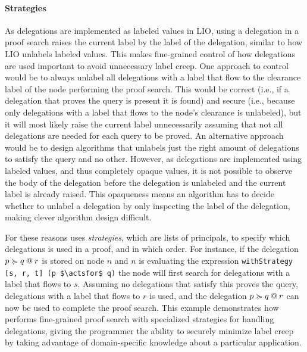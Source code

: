 \paragraph{Strategies}
As delegations are implemented as labeled values in LIO, using a delegation in a proof search raises the current label by the label of the delegation, similar to how LIO unlabels labeled values. This makes fine-grained control of how delegations are used important to avoid unnecessary label creep.
One approach to control would be to always unlabel all delegations with a label that flow to the clearance label of the node performing the proof search. This would be correct (i.e., if a delegation that proves the query is present it is found) and secure (i.e., because only delegations with a label that flows to the node's clearance is unlabeled), but it will most likely raise the current label unnecessarily assuming that not all delegations are needed for each query to be proved.
An alternative approach would be to design algorithms that unlabels just the right amount of delegations to satisfy the query and no other. However, as delegations are implemented using labeled values, and thus completely opaque values, it is not possible to observe the body of the delegation before the delegation is unlabeled and the current label is already raised. This opaqueness means an algorithm has to decide whether to unlabel a delegation by only inspecting the label of the delegation, making clever algorithm design difficult.

For these reasons \lang{} uses \emph{strategies}, which are lists of principals, to specify which delegations is used in a proof, and in which order. For instance, if the delegation $\lb{r}{p \actsfor q}$ is stored on node $n$ and $n$ is evaluating the expression \lstinline[mathescape]!withStrategy [s, r, t] (p $\actsfor$ q)! the node will first search for delegations with a label that flows to $s$. Assuming no delegations that satisfy this proves the query, delegations with a label that flows to $r$ is used, and the delegation $\lb{r}{p \actsfor q}$ can now be used to complete the proof search. This example demonstrates how \lang{} performs fine-grained proof search with specialized strategies for handling delegations, giving the programmer the ability to securely minimize label creep by taking advantage of domain-specific knowledge about a particular application.

